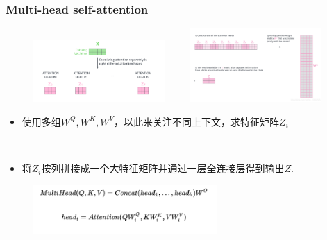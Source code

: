 \documentclass[10pt,t,handout]{beamer}
\begin{document}
\begin{frame}
	\frametitle{Multi-head self-attention}
 	\begin{figure}
 	\centering
 	\includegraphics[width=5cm]{222.png}	~~~~
 	\includegraphics[width=5cm]{333.png}	
 \end{figure}
\begin{itemize}

	\item<1-> 使用多组$W^{Q}, W^{K}, W^{V}$，以此来关注不同上下文，求特征矩阵$Z_{i}$
	\
	
	\
 
	\item<2->  将$Z_{i}$按列拼接成一个大特征矩阵并通过一层全连接层得到输出$Z$.
\end{itemize}
\begin{figure}
		\includegraphics[width=7cm]{9.png}	
\end{figure}
\end{frame}
\end{document}
